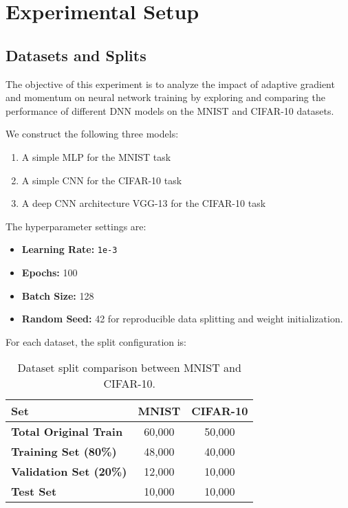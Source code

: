 \documentclass[12pt]{article}
\begin{document}
\section{Experimental Setup}

\subsection{Datasets and Splits}

The objective of this experiment is to analyze the impact of adaptive gradient and momentum on neural network training by exploring and comparing the performance of different DNN models on the MNIST and CIFAR-10 datasets.

We construct the following three models:
\begin{enumerate}
    \item A simple MLP for the MNIST task
    \item A simple CNN for the CIFAR-10 task
    \item A deep CNN architecture VGG-13 for the CIFAR-10 task
\end{enumerate}

The hyperparameter settings are:
\begin{itemize}
    \item \textbf{Learning Rate:} \texttt{1e-3}
    \item \textbf{Epochs:} 100
    \item \textbf{Batch Size:} 128
    \item \textbf{Random Seed:} 42 for reproducible data splitting and weight initialization.
\end{itemize}

For each dataset, the split configuration is:
\begin{table}[H]
\centering
\begin{tabular}{lcc}
\toprule
\textbf{Set} & \textbf{MNIST} & \textbf{CIFAR-10} \\
\midrule
\textbf{Total Original Train} & 60,000 & 50,000 \\
\textbf{Training Set (80\%)} & 48,000 & 40,000 \\
\textbf{Validation Set (20\%)} & 12,000 & 10,000 \\
\textbf{Test Set} & 10,000 & 10,000 \\
\bottomrule
\end{tabular}
\caption{Dataset split comparison between MNIST and CIFAR-10.}
\label{tab:dataset-split-vertical}
\end{table}
\end{document}
